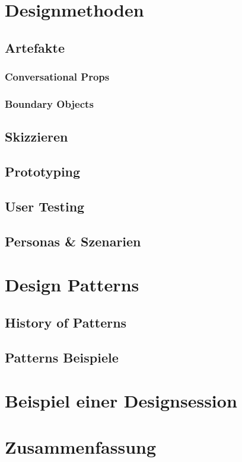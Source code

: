 \section{Designmethoden}
\subsection{Artefakte}
\subsubsection{Conversational Props}
\subsubsection{Boundary Objects}
\subsection{Skizzieren}
\subsection{Prototyping}
\subsection{User Testing}
\subsection{Personas \& Szenarien}

\section{Design Patterns}
\subsection{History of Patterns}
\subsection{Patterns Beispiele}

\section{Beispiel einer Designsession}

\section*{Zusammenfassung}